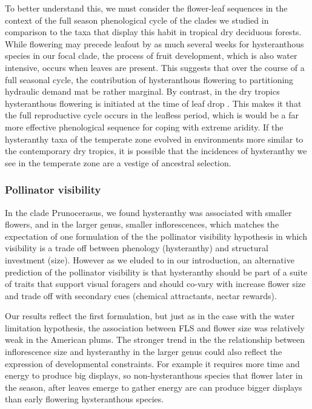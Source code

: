 \documentclass{article}[11pt]
\begin{document}
To better understand this, we must consider the flower-leaf sequences in the context of the full season phenological cycle of the clades we studied in comparison to the taxa that display this habit in tropical dry deciduous forests. While flowering may precede leafout by as much several weeks for hysteranthous species in our focal clade, the process of fruit development, which is also water intensive, occurs when leaves are present. This suggests that over the course of a full seasonal cycle, the contribution of hysteranthous flowering to partitioning hydraulic demand mat be rather marginal. By contrast, in the dry tropics hysteranthous flowering is initiated at the time of leaf drop \citep{Borchert1983,Franklin2016}. This makes it that the full reproductive cycle occurs in the leafless period, which is would be a far more effective phenological sequence for coping with extreme aridity. If the hysteranthy taxa of the temperate zone evolved in environments more similar to the contemporary dry tropics, it is possible that the incidences of hysteranthy we see in the temperate zone are a vestige of ancestral selection. 

\subsubsection*{Pollinator visibility}
In the clade Prunocerasus, we found hysteranthy was associated with smaller flowers, and in the larger genus, smaller inflorescences, which matches the expectation of one formulation of the the pollinator visibility hypothesis in which visibility is a trade off between phenology (hysteranthy) and structural investment (size). However as we eluded to in our introduction, an alternative prediction of the pollinator visibility is that hysteranthy should be part of a suite of traits that support visual foragers and should co-vary with increase flower size and trade off with secondary cues (chemical attractants, nectar rewards).

Our results reflect the first formulation, but just as in the case with the water limitation hypothesis, the association between FLS and flower size was relatively weak in the American plums. The stronger trend in the the relationship between inflorescence size and hysteranthy in the larger genus could also reflect the expression of developmental constraints.  For example it requires more time and energy to produce big displays, so non-hysteranthous species that flower later in the season, after leaves emerge to gather energy are can produce bigger displays than early flowering hysteranthous species. %
\end{document}
